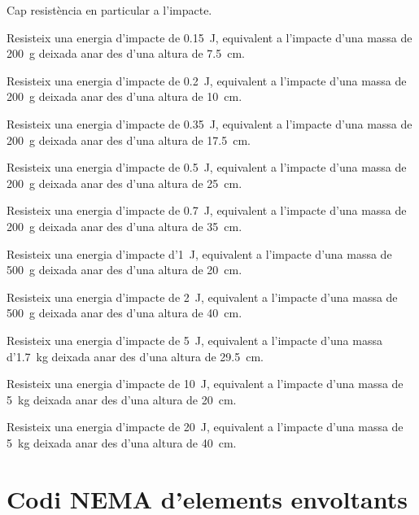 \begin{list}{}
	{\setlength{\labelwidth}{10mm} \setlength{\leftmargin}{15mm} \setlength{\labelsep}{5mm}}
	\item[00] Cap resistència en particular a l'impacte.
	\item[01] Resisteix una energia d'impacte de \qty{0,15}{J}, equivalent a l'impacte d'una massa de \qty{200}{g} deixada anar des d'una altura de \qty{7,5}{cm}.
	\item[02] Resisteix una energia d'impacte de \qty{0,2}{J}, equivalent a l'impacte d'una massa de \qty{200}{g} deixada anar des d'una altura de \qty{10}{cm}.
	\item[03] Resisteix una energia d'impacte de \qty{0,35}{J}, equivalent a l'impacte d'una massa de \qty{200}{g} deixada anar des d'una altura de \qty{17,5}{cm}.
	\item[04] Resisteix una energia d'impacte de \qty{0,5}{J}, equivalent a l'impacte d'una massa de \qty{200}{g} deixada anar des d'una altura de \qty{25}{cm}.
	\item[05] Resisteix una energia d'impacte de \qty{0,7}{J}, equivalent a l'impacte d'una massa de \qty{200}{g} deixada anar des d'una altura de \qty{35}{cm}.
	\item[06]Resisteix una energia d'impacte d'\qty{1}{J}, equivalent a l'impacte d'una massa de \qty{500}{g} deixada anar des d'una altura de \qty{20}{cm}.
	\item[07]Resisteix una energia d'impacte de \qty{2}{J}, equivalent a l'impacte d'una massa de \qty{500}{g} deixada anar des d'una altura de \qty{40}{cm}.
	\item[08]Resisteix una energia d'impacte de \qty{5}{J}, equivalent a l'impacte d'una massa d'\qty{1,7}{kg} deixada anar des d'una altura de \qty{29,5}{cm}.
	\item[09]Resisteix una energia d'impacte de \qty{10}{J}, equivalent a l'impacte d'una massa de \qty{5}{kg} deixada anar des d'una altura de \qty{20}{cm}.
	\item[10]Resisteix una energia d'impacte de \qty{20}{J}, equivalent a l'impacte d'una massa de \qty{5}{kg} deixada anar des d'una altura de \qty{40}{cm}.
\end{list}


\section{Codi NEMA d'elements envoltants}
 

